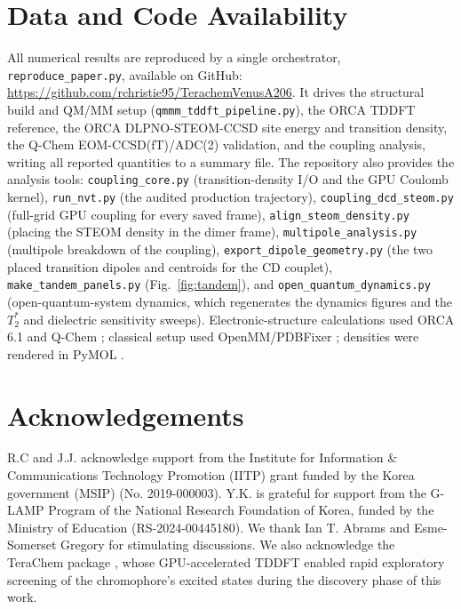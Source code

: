 \documentclass[journal=jpcbfk, manuscript=article, layout=twocolumn, doi=true]{achemso}
\begin{document}
\section{Data and Code Availability}

All numerical results are reproduced by a single orchestrator, \texttt{reproduce\_paper.py}, available on GitHub: \url{https://github.com/rchristie95/TerachemVenusA206}. It drives the structural build and QM/MM setup (\texttt{qmmm\_\allowbreak tddft\_\allowbreak pipeline.py}), the ORCA TDDFT reference, the ORCA DLPNO-STEOM-CCSD site energy and transition density, the Q-Chem EOM-CCSD(fT)/ADC(2) validation, and the coupling analysis, writing all reported quantities to a summary file. The repository also provides the analysis tools: \texttt{coupling\_core.py} (transition-density I/O and the GPU Coulomb kernel), \texttt{run\_nvt.py} (the audited production trajectory), \texttt{coupling\_dcd\_steom.py} (full-grid GPU coupling for every saved frame), \texttt{align\_\allowbreak steom\_\allowbreak density.py} (placing the STEOM density in the dimer frame), \texttt{multipole\_analysis.py} (multipole breakdown of the coupling), \texttt{export\_\allowbreak dipole\_\allowbreak geometry.py} (the two placed transition dipoles and centroids for the CD couplet), \texttt{make\_tandem\_panels.py} (Fig.~\ref{fig:tandem}), and \texttt{open\_\allowbreak quantum\_\allowbreak dynamics.py} (open-quantum-system dynamics, which regenerates the dynamics figures and the $T_2^*$ and dielectric sensitivity sweeps). Electronic-structure calculations used ORCA 6.1 \cite{neese2020orca,neese2022orca} and Q-Chem \cite{epifanovsky2021qchem}; classical setup used OpenMM/PDBFixer \cite{openmm2017,pdbfixer}; densities were rendered in PyMOL \cite{delano2002pymol}.

\section{Acknowledgements}
R.C and J.J. acknowledge support from the Institute for Information \& Communications Technology Promotion (IITP) grant funded by the Korea government (MSIP) (No. 2019-000003). Y.K. is grateful for support from the G-LAMP Program of the National Research Foundation of Korea, funded by the Ministry of Education (RS-2024-00445180). We thank Ian T. Abrams and Esme-Somerset Gregory for stimulating discussions. We also acknowledge the TeraChem package \cite{terachem2009,seritan2021terachem}, whose GPU-accelerated TDDFT enabled rapid exploratory screening of the chromophore's excited states during the discovery phase of this work.
\end{document}
